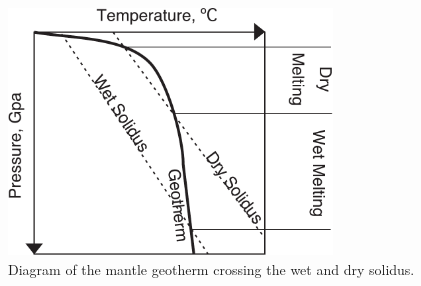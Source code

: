 \begin{subappendices}
\begin{figure}
\centering
\includegraphics[width=8.6cm]{./figures/ch2-solidi-geotherm.pdf}
\caption{Diagram of the mantle geotherm crossing the wet and dry solidus.}
\label{fg:solidus}
\end{figure}


\end{subappendices}
